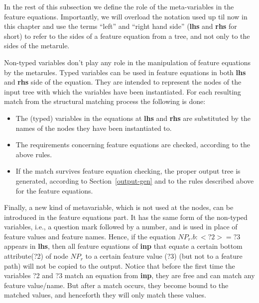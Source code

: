 In the rest of this subsection we define the role of the meta-variables 
in the feature equations. Importantly, we will overload the notation used up 
til now in this chapter and use the terms ``left'' and ``right hand 
side'' ({\bf lhs} and {\bf rhs} for short) to refer to the sides of a 
feature equation from a tree, and not only to the sides of the metarule. 
 
Non-typed variables don't play any role in the manipulation of feature 
equations by the metarules. 
Typed variables can be used in feature equations in both {\bf lhs} and 
{\bf rhs} side of the equation. 
They are intended to represent the nodes of the input tree with which 
the variables have been instantiated. For each resulting match 
from the structural matching process the following is done: 
 
\begin{itemize} 
\item   The (typed) variables in the equations at {\bf lhs} and {\bf rhs} are 
        substituted by the names of the nodes they have been instantiated to. 
 
\item   The requirements concerning feature equations are checked, according 
        to the above rules. 
 
\item   If the match survives feature equation checking, the proper output tree 
        is generated, according to Section~\ref{output-gen} and to the 
        rules described above for the feature equations. 
\end{itemize} 
 
Finally, a new kind of metavariable, which is not used at the nodes, can be 
introduced in the feature equations part. It has the same form of the 
non-typed variables, i.e., a question mark followed by a number, and is used 
in place of feature values and feature names. Hence, if the equation 
$NP_r.b:<?2> = ?3$ appears in {\bf lhs}, then all feature 
equations of {\bf inp} that equate a certain  bottom attribute(?2) of node 
$NP_r$ to a certain feature value (?3) (but not to a feature path) will not 
be copied to the output. Notice that before the first time the variables ?2 
and ?3 match an equation from {\bf inp}, they are free and can match 
any feature 
value/name. But after a match occurs, 
they become bound to the matched values, and 
henceforth they will only match these values. 
 
\setcounter{topnumber}{4} 
\setcounter{bottomnumber}{4} 
\setcounter{totalnumber}{4} 
 
